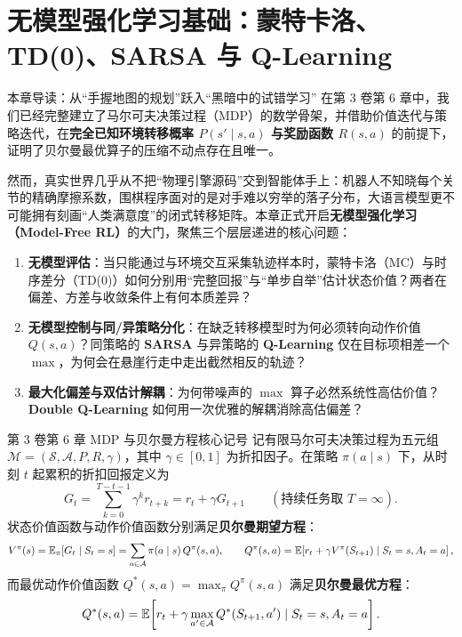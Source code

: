 \chapter[无模型强化学习：TD、SARSA 与 Q-Learning]{无模型强化学习基础：蒙特卡洛、TD(0)、SARSA 与 Q-Learning}
\label{ch:model-free-rl}


\begin{chapIntro}{本章导读：从“手握地图的规划”跃入“黑暗中的试错学习”}
在第 3 卷第 6 章中，我们已经完整建立了马尔可夫决策过程（MDP）的数学骨架，并借助价值迭代与策略迭代，在\textbf{完全已知环境转移概率 $P(s'\mid s,a)$ 与奖励函数 $R(s,a)$} 的前提下，证明了贝尔曼最优算子的压缩不动点存在且唯一。

然而，真实世界几乎从不把“物理引擎源码”交到智能体手上：机器人不知晓每个关节的精确摩擦系数，围棋程序面对的是对手难以穷举的落子分布，大语言模型更不可能拥有刻画“人类满意度”的闭式转移矩阵。本章正式开启\textbf{无模型强化学习（Model-Free RL）}的大门，聚焦三个层层递进的核心问题：
\begin{enumerate}
  \item \textbf{无模型评估}：当只能通过与环境交互采集轨迹样本时，蒙特卡洛（MC）与时序差分（TD(0)）如何分别用“完整回报”与“单步自举”估计状态价值？两者在偏差、方差与收敛条件上有何本质差异？
  \item \textbf{无模型控制与同/异策略分化}：在缺乏转移模型时为何必须转向动作价值 $Q(s,a)$？同策略的 \textbf{SARSA} 与异策略的 \textbf{Q-Learning} 仅在目标项相差一个 $\max$，为何会在悬崖行走中走出截然相反的轨迹？
  \item \textbf{最大化偏差与双估计解耦}：为何带噪声的 $\max$ 算子必然系统性高估价值？\textbf{Double Q-Learning} 如何用一次优雅的解耦消除高估偏差？
\end{enumerate}
\end{chapIntro}

\begin{recallBox}{第 3 卷第 6 章 MDP 与贝尔曼方程核心记号}
记有限马尔可夫决策过程为五元组 $\mathcal{M} = (\mathcal{S}, \mathcal{A}, P, R, \gamma)$，其中 $\gamma \in [0, 1]$ 为折扣因子。在策略 $\pi(a \mid s)$ 下，从时刻 $t$ 起累积的折扣回报定义为
\[
  G_t = \sum_{k=0}^{T-t-1} \gamma^k r_{t+k} = r_t + \gamma G_{t+1} \qquad (\text{持续任务取 } T = \infty).
\]
状态价值函数与动作价值函数分别满足\textbf{贝尔曼期望方程}：
\[
  V^\pi(s) = \mathbb{E}_\pi[G_t \mid S_t = s] = \sum_{a \in \mathcal{A}} \pi(a \mid s)\, Q^\pi(s, a), \qquad
  Q^\pi(s, a) = \mathbb{E}\!\left[r_t + \gamma V^\pi(S_{t+1}) \mid S_t = s, A_t = a\right],
\]
而最优动作价值函数 $Q^*(s, a) = \max_\pi Q^\pi(s, a)$ 满足\textbf{贝尔曼最优方程}：
\[
  Q^*(s, a) = \mathbb{E}\!\left[r_t + \gamma \max_{a' \in \mathcal{A}} Q^*(S_{t+1}, a') \mid S_t = s, A_t = a\right].
\]
\end{recallBox}

